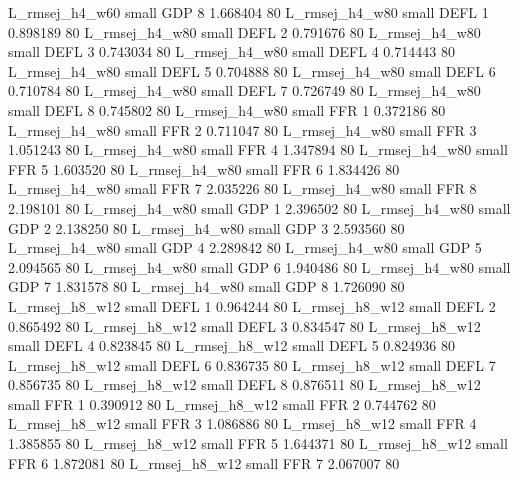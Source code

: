 L_rmsej_h4_w60      small      GDP                 8 1.668404 80
L_rmsej_h4_w80      small     DEFL                 1 0.898189 80
L_rmsej_h4_w80      small     DEFL                 2 0.791676 80
L_rmsej_h4_w80      small     DEFL                 3 0.743034 80
L_rmsej_h4_w80      small     DEFL                 4 0.714443 80
L_rmsej_h4_w80      small     DEFL                 5 0.704888 80
L_rmsej_h4_w80      small     DEFL                 6 0.710784 80
L_rmsej_h4_w80      small     DEFL                 7 0.726749 80
L_rmsej_h4_w80      small     DEFL                 8 0.745802 80
L_rmsej_h4_w80      small      FFR                 1 0.372186 80
L_rmsej_h4_w80      small      FFR                 2 0.711047 80
L_rmsej_h4_w80      small      FFR                 3 1.051243 80
L_rmsej_h4_w80      small      FFR                 4 1.347894 80
L_rmsej_h4_w80      small      FFR                 5 1.603520 80
L_rmsej_h4_w80      small      FFR                 6 1.834426 80
L_rmsej_h4_w80      small      FFR                 7 2.035226 80
L_rmsej_h4_w80      small      FFR                 8 2.198101 80
L_rmsej_h4_w80      small      GDP                 1 2.396502 80
L_rmsej_h4_w80      small      GDP                 2 2.138250 80
L_rmsej_h4_w80      small      GDP                 3 2.593560 80
L_rmsej_h4_w80      small      GDP                 4 2.289842 80
L_rmsej_h4_w80      small      GDP                 5 2.094565 80
L_rmsej_h4_w80      small      GDP                 6 1.940486 80
L_rmsej_h4_w80      small      GDP                 7 1.831578 80
L_rmsej_h4_w80      small      GDP                 8 1.726090 80
L_rmsej_h8_w12      small     DEFL                 1 0.964244 80
L_rmsej_h8_w12      small     DEFL                 2 0.865492 80
L_rmsej_h8_w12      small     DEFL                 3 0.834547 80
L_rmsej_h8_w12      small     DEFL                 4 0.823845 80
L_rmsej_h8_w12      small     DEFL                 5 0.824936 80
L_rmsej_h8_w12      small     DEFL                 6 0.836735 80
L_rmsej_h8_w12      small     DEFL                 7 0.856735 80
L_rmsej_h8_w12      small     DEFL                 8 0.876511 80
L_rmsej_h8_w12      small      FFR                 1 0.390912 80
L_rmsej_h8_w12      small      FFR                 2 0.744762 80
L_rmsej_h8_w12      small      FFR                 3 1.086886 80
L_rmsej_h8_w12      small      FFR                 4 1.385855 80
L_rmsej_h8_w12      small      FFR                 5 1.644371 80
L_rmsej_h8_w12      small      FFR                 6 1.872081 80
L_rmsej_h8_w12      small      FFR                 7 2.067007 80
